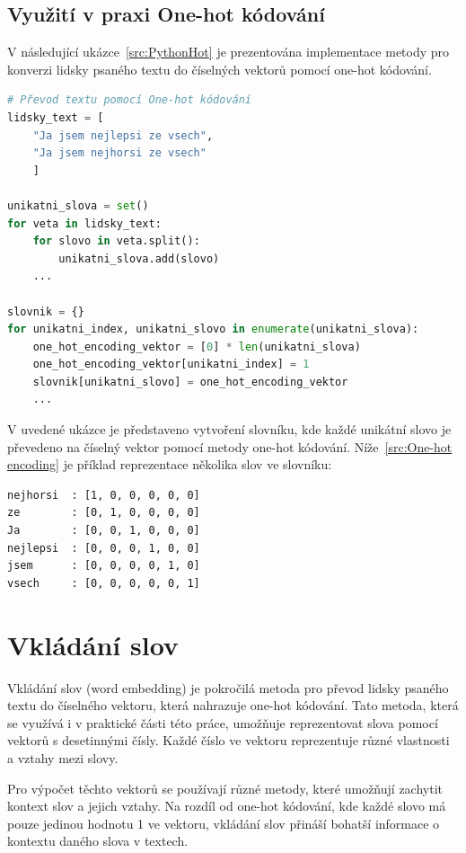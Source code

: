 \subsection{Využití v praxi One-hot kódování}
V následující ukázce~\ref{src:PythonHot} je prezentována implementace metody pro konverzi lidsky psaného textu do číselných vektorů pomocí one-hot kódování.

\begin{lstlisting}[language=Python,label=src:PythonHot,caption={One-hot kódování v praxi}]
# Převod textu pomocí One-hot kódování
lidsky_text = [
	"Ja jsem nejlepsi ze vsech",
    "Ja jsem nejhorsi ze vsech"
	]

unikatni_slova = set()
for veta in lidsky_text:
    for slovo in veta.split():
        unikatni_slova.add(slovo)
    ...

slovnik = {}
for unikatni_index, unikatni_slovo in enumerate(unikatni_slova):
    one_hot_encoding_vektor = [0] * len(unikatni_slova)
    one_hot_encoding_vektor[unikatni_index] = 1
    slovnik[unikatni_slovo] = one_hot_encoding_vektor
    ...
\end{lstlisting}

V uvedené ukázce je představeno vytvoření slovníku, kde každé unikátní slovo je převedeno na číselný vektor pomocí metody one-hot kódování.
Níže~\ref{src:One-hot encoding} je příklad reprezentace několika slov ve slovníku:

\begin{lstlisting}[label=src:One-hot encoding,caption={One-hot kódování prezentace výsledného formátu dat}]
nejhorsi  : [1, 0, 0, 0, 0, 0]
ze        : [0, 1, 0, 0, 0, 0]
Ja        : [0, 0, 1, 0, 0, 0]
nejlepsi  : [0, 0, 0, 1, 0, 0]
jsem      : [0, 0, 0, 0, 1, 0]
vsech     : [0, 0, 0, 0, 0, 1]
\end{lstlisting}

\section{Vkládání slov}
Vkládání slov (word embedding) je pokročilá metoda pro převod lidsky psaného textu do číselného vektoru, která nahrazuje one-hot kódování. Tato metoda, která se využívá i v praktické části této práce, umožňuje reprezentovat slova pomocí vektorů s desetinnými čísly. Každé číslo ve vektoru reprezentuje různé vlastnosti a vztahy mezi slovy.

Pro výpočet těchto vektorů se používají různé metody, které umožňují zachytit kontext slov a jejich vztahy.
Na rozdíl od one-hot kódování, kde každé slovo má pouze jedinou hodnotu 1 ve vektoru, vkládání slov přináší bohatší informace o kontextu daného slova v textech.

